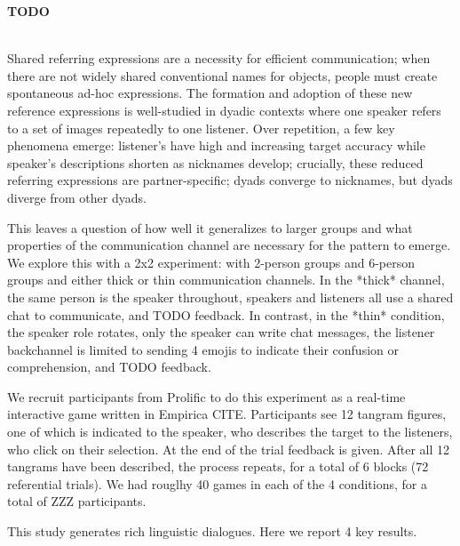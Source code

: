 \documentclass[11pt,a4paper]{article}
\renewcommand{\title}[1]{\textbf{#1}\\}
\newcommand{\authors}[1]{\iftoggle{anonymous}{\phantom{#1}}{#1}\\}
\newcommand{\email}[1]{\iftoggle{anonymous}{\phantom{#1}}{#1}}
\begin{document}


\title{TODO}
\authors{Veronica Boyce (Stanford), Roger Hawkins (Princeton), Noah Goodman (Stanford), Michael C. Frank (Stanford)} 
\email{vboyce@stanford.edu}
\newline
%

Shared referring expressions are a necessity for efficient communication; when there are not widely shared conventional names for objects, people must create spontaneous ad-hoc expressions. The formation and adoption of these new reference expressions is well-studied in dyadic contexts where one speaker refers to a set of images repeatedly to one listener. Over repetition, a few key phenomena emerge: listener's have high and increasing target accuracy while speaker's descriptions shorten as nicknames develop; crucially, these reduced referring expressions are partner-specific; dyads converge to nicknames, but dyads diverge from other dyads. 


This leaves a question of how well it generalizes to larger groups and what properties of the communication channel are necessary for the pattern to emerge. We explore this with a 2x2 experiment: with 2-person groups and 6-person groups and either thick or thin communication channels. In the *thick* channel, the same person is the speaker throughout, speakers and listeners all use a shared chat to communicate, and TODO feedback. In contrast, in the *thin* condition, the speaker role rotates, only the speaker can write chat messages, the listener backchannel is limited to sending 4 emojis to indicate their confusion or comprehension, and TODO feedback. 

We recruit participants from Prolific to do this experiment as a real-time interactive game written in Empirica CITE. Participants see 12 tangram figures, one of which is indicated to the speaker, who describes the target to the listeners, who click on their selection. At the end of the trial feedback is given.  After all 12 tangrams have been described, the process repeats, for a total of 6 blocks (72 referential trials). We had rouglhy 40 games in each of the 4 conditions, for a total of ZZZ participants. 

This study generates rich linguistic dialogues. Here we report 4 key results. 
\end{document}
